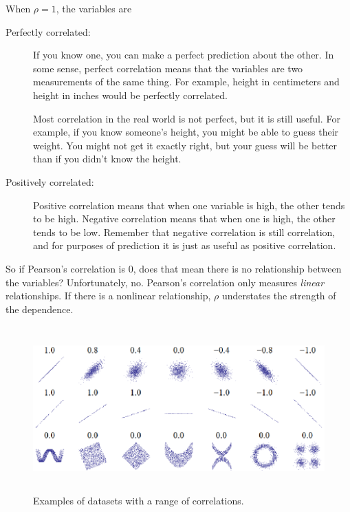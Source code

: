 \documentclass[12pt]{book}
\begin{document}
When $\rho=1$, the variables are 

\begin{description}

\item[Perfectly correlated:] If 
you know one, you can make a perfect prediction about the other.
In some sense, perfect correlation means that the variables are two
measurements of the same thing.  For example, height in centimeters and
height in inches would be perfectly correlated.

Most correlation in the real world is not perfect, but it
is still useful.  For example, if you know someone's height, you might
be able to guess their weight.  You might not get it exactly right, but
your guess will be better than if you didn't know the height.

\item[Positively correlated:] Positive correlation means that when one
  variable is high, the other tends to be high.  Negative correlation
  means that when one is high, the other tends to be low.  Remember that
  negative correlation is still correlation, and for purposes of
  prediction it is just as useful as positive correlation.

\end{description}

So if Pearson's correlation is 0, does that mean there is no
relationship between the variables?  Unfortunately, no.  Pearson's
correlation only measures {\em linear} relationships.  If there is a
nonlinear relationship, $\rho$ understates the strength of the
dependence.

\begin{figure}
\centerline{\includegraphics[height=2.5in]{figs/Correlation_examples.eps}}
\caption{Examples of datasets with a range of correlations.}
\label{corr_examples}
\end{figure}
\end{document}
